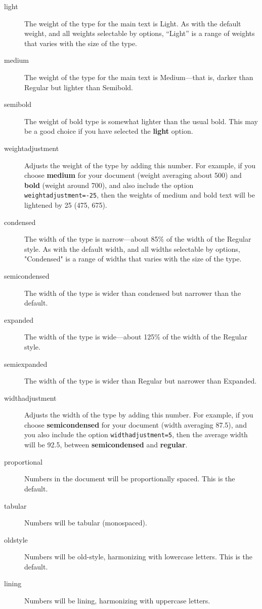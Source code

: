 \documentclass[12pt]{article}
\newcommand{\option}[1]{{\color{RViolet}\textbf{#1}}}
\begin{document}
\begin{description}
    \item[light] The weight of the type for the main text is Light. As with the default
    weight, and all weights selectable by options, “Light” is a range of weights that varies
    with the size of the type.
    \item[medium] The weight of the type for the main text is Medium---that is, darker than
    Regular but lighter than Semibold.
    \item[semibold] The weight of bold type is somewhat lighter than the usual bold. This may be a
    good choice if you have selected the \option{light} option.
    \item[weightadjustment] Adjusts the weight of the type by adding this number.
    For example, if you choose \option{medium} for your document (weight averaging about 500)
    and \option{bold} (weight around 700), and also include the option {\color{BrickRed}\verb|weightadjustment=-25|},
    then the weights of medium and bold text will be lightened by 25 (475, 675).
    \item[condensed] The width of the type is narrow---about 85\% of the width of the Regular style.
    As with the default
    width, and all widths selectable by options, "Condensed" is a range of widths that varies
    with the size of the type.
    \item[semicondensed] The width of the type is wider than condensed but narrower than the default.
    \item[expanded] The width of the type is wide---about 125\% of the width of the Regular style.
    \item[semiexpanded] The width of the type is wider than Regular but narrower than Expanded.
    \item[widthadjustment] Adjusts the width of the type by adding this number. For example, if you
    choose \option{semicondensed} for your document (width averaging 87.5), and you also include
    the option {\color{BrickRed}\verb|widthadjustment=5|}, then the average width will be 92.5, between
    \option{semicondensed} and \option{regular}.
    \item[proportional] Numbers in the document will be proportionally spaced. This is the default.
    \item[tabular] Numbers will be tabular (monospaced).
    \item[oldstyle] Numbers will be old-style, harmonizing with lowercase letters. This is the default.
    \item[lining] Numbers will be lining, harmonizing with uppercase letters.
\end{description}
\end{document}

